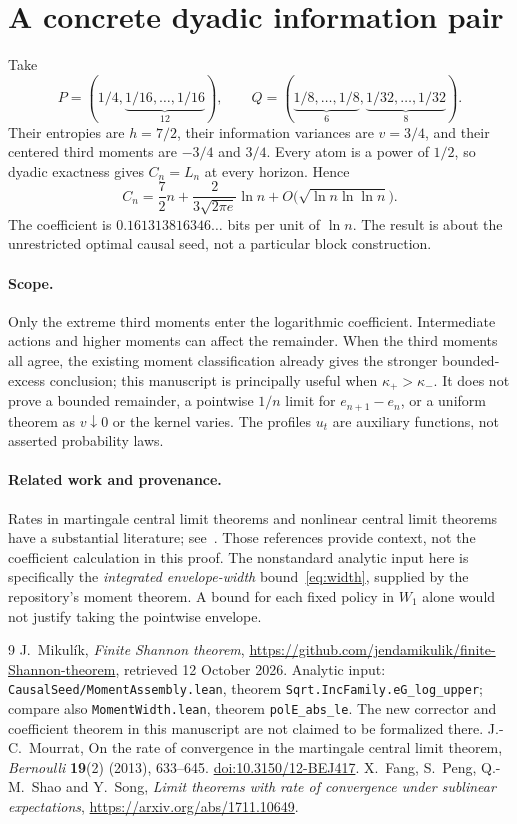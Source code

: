 \documentclass[11pt]{article}
\begin{document}
\section{A concrete dyadic information pair}
Take
\[
 P=(1/4,\underbrace{1/16,\ldots,1/16}_{12}),\qquad
 Q=(\underbrace{1/8,\ldots,1/8}_{6},
       \underbrace{1/32,\ldots,1/32}_{8}).
\]
Their entropies are $h=7/2$, their information variances are $v=3/4$,
and their centered third moments are $-3/4$ and $3/4$.
Every atom is a power of $1/2$, so dyadic exactness gives $C_n=L_n$
at every horizon. Hence
\[
 \boxed{C_n=\frac72n+
 \frac{2}{3\sqrt{2\pi e}}\ln n
 +O\bigl(\sqrt{\ln n\ln\ln n}\bigr).}
\]
The coefficient is $0.161313816346\ldots$ bits per unit of $\ln n$.
The result is about the unrestricted optimal causal seed, not a
particular block construction.

\paragraph{Scope.}
Only the extreme third moments enter the logarithmic coefficient.
Intermediate actions and higher moments can affect the remainder.
When the third moments all agree, the existing moment classification
already gives the stronger bounded-excess conclusion; this manuscript
is principally useful when $\kappa_+>\kappa_-$.
It does not prove a bounded remainder, a pointwise $1/n$ limit for
$e_{n+1}-e_n$, or a uniform theorem as $v\downarrow0$ or the kernel varies.
The profiles $u_t$ are auxiliary functions, not asserted probability laws.

\paragraph{Related work and provenance.}
Rates in martingale central limit theorems and nonlinear central limit
theorems have a substantial literature; see~\cite{mourrat,fang}.
Those references provide context, not the coefficient calculation in
this proof. The nonstandard analytic input here is specifically the
\emph{integrated envelope-width} bound~\eqref{eq:width}, supplied by
the repository's moment theorem. A bound for each fixed policy in
$W_1$ alone would not justify taking the pointwise envelope.

\begin{thebibliography}{9}
 J.~Mikul\'ik, \emph{Finite Shannon theorem},
\url{https://github.com/jendamikulik/finite-Shannon-theorem},
retrieved 12 October 2026. Analytic input:
\texttt{CausalSeed/MomentAssembly.lean}, theorem
\texttt{Sqrt.IncFamily.eG\_log\_upper}; compare also
\texttt{MomentWidth.lean}, theorem \texttt{polE\_abs\_le}.
The new corrector and coefficient theorem in this manuscript are not
claimed to be formalized there.
 J.-C.~Mourrat, On the rate of convergence in the
martingale central limit theorem, \emph{Bernoulli} \textbf{19}(2)
(2013), 633--645. \href{https://doi.org/10.3150/12-BEJ417}{doi:10.3150/12-BEJ417}.
 X.~Fang, S.~Peng, Q.-M.~Shao and Y.~Song,
\emph{Limit theorems with rate of convergence under sublinear expectations},
\url{https://arxiv.org/abs/1711.10649}.
\end{thebibliography}
\end{document}
